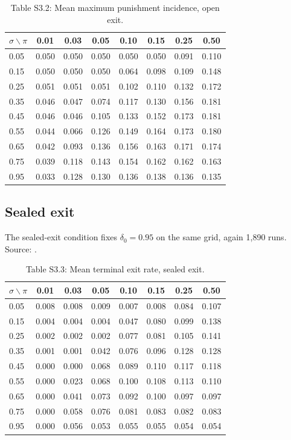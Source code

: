 \documentclass[12pt]{article}
\begin{document}
\begin{table}[htbp]
\centering
\small
\caption{Table S3.2: Mean maximum punishment incidence, open exit.}
\begin{tabular}{lccccccc}
\toprule
$\sigma \backslash \pi$ & 0.01 & 0.03 & 0.05 & 0.10 & 0.15 & 0.25 & 0.50 \\
\midrule
0.05 & 0.050 & 0.050 & 0.050 & 0.050 & 0.050 & 0.091 & 0.110 \\
0.15 & 0.050 & 0.050 & 0.050 & 0.064 & 0.098 & 0.109 & 0.148 \\
0.25 & 0.051 & 0.051 & 0.051 & 0.102 & 0.110 & 0.132 & 0.172 \\
0.35 & 0.046 & 0.047 & 0.074 & 0.117 & 0.130 & 0.156 & 0.181 \\
0.45 & 0.046 & 0.046 & 0.105 & 0.133 & 0.152 & 0.173 & 0.181 \\
0.55 & 0.044 & 0.066 & 0.126 & 0.149 & 0.164 & 0.173 & 0.180 \\
0.65 & 0.042 & 0.093 & 0.136 & 0.156 & 0.163 & 0.171 & 0.174 \\
0.75 & 0.039 & 0.118 & 0.143 & 0.154 & 0.162 & 0.162 & 0.163 \\
0.95 & 0.033 & 0.128 & 0.130 & 0.136 & 0.138 & 0.136 & 0.135 \\
\bottomrule
\end{tabular}
\end{table}

\subsection{Sealed exit}

The sealed-exit condition fixes $\delta_0=0.95$ on the same grid, again 1,890
runs. Source: .

\begin{table}[htbp]
\centering
\small
\caption{Table S3.3: Mean terminal exit rate, sealed exit.}
\begin{tabular}{lccccccc}
\toprule
$\sigma \backslash \pi$ & 0.01 & 0.03 & 0.05 & 0.10 & 0.15 & 0.25 & 0.50 \\
\midrule
0.05 & 0.008 & 0.008 & 0.009 & 0.007 & 0.008 & 0.084 & 0.107 \\
0.15 & 0.004 & 0.004 & 0.004 & 0.047 & 0.080 & 0.099 & 0.138 \\
0.25 & 0.002 & 0.002 & 0.002 & 0.077 & 0.081 & 0.105 & 0.141 \\
0.35 & 0.001 & 0.001 & 0.042 & 0.076 & 0.096 & 0.128 & 0.128 \\
0.45 & 0.000 & 0.000 & 0.068 & 0.089 & 0.110 & 0.117 & 0.118 \\
0.55 & 0.000 & 0.023 & 0.068 & 0.100 & 0.108 & 0.113 & 0.110 \\
0.65 & 0.000 & 0.041 & 0.073 & 0.092 & 0.100 & 0.097 & 0.097 \\
0.75 & 0.000 & 0.058 & 0.076 & 0.081 & 0.083 & 0.082 & 0.083 \\
0.95 & 0.000 & 0.056 & 0.053 & 0.055 & 0.055 & 0.054 & 0.054 \\
\bottomrule
\end{tabular}
\end{table}
\end{document}
